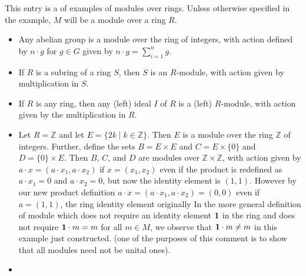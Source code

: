 \documentclass[12pt]{article}
\begin{document}
This entry is a  of examples of modules over rings.  Unless otherwise specified in the example, $M$ will be a module over a ring $R$.

\begin{itemize}
\item Any abelian group is a module over the ring of integers, with action defined by $n\cdot g$ for $g\in G$ given by $n\cdot g=\sum_{i=1}^n g$.
\item If $R$ is a subring of a ring $S$, then $S$ is an $R$-module, with action given by multiplication in $S$.
\item If $R$ is any ring, then any (left) ideal $I$ of $R$ is a (left) $R$-module, with action given by the multiplication in $R$.
\item Let $R=\mathbb{Z}$ and let $E = \{2k \mid k \in \mathbb{Z}\}$. Then $E$ is a module over the ring $\mathbb{Z}$ of integers. Further, define the sets $B = E \times E$ and $C = E \times \{0\}$ and $D = \{0\} \times  E$. Then $B$, $C$, and $D$ are modules over $\mathbb{Z} \times  \mathbb{Z}$, with action given by $a \cdot x = 
(a \cdot x_1, a \cdot x_2)$ if $x = (x_1,x_2)$ even if the product is redefined as $a \cdot x_1 = 0$ and $a \cdot x_2 = 0$, but now the identity element is $(1,1)$. However by our new product definition $a \cdot x = (a \cdot x_1, a \cdot x_2) = (0,0)$ even if $a = (1,1)$, the ring identity element originally  In the more general definition of module which does not require an identity element $\bf{1}$ in the ring and does not require ${\bf 1} \cdot m = m$ for all $m \in M$, we observe that ${\bf 1} \cdot m \neq m$  in this example just constructed.  (one of the purposes of this comment is to show that all modules need not be unital ones).
\item {}
\end{itemize}
\end{document}
